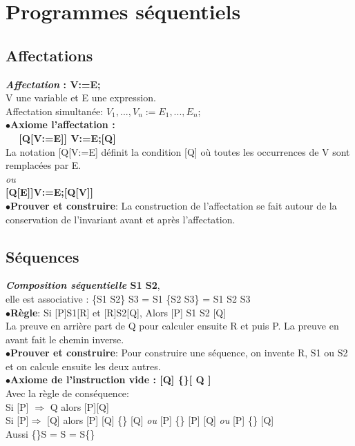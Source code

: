 \section{Programmes séquentiels}
\subsection{Affectations}
\textbf{\textit{Affectation} : V:=E;}\\ V une variable et E une expression.\\ 
Affectation simultanée: $V_1,...,V_n := E_1,...,E_n$;\\

$\bullet$\textbf{Axiome l'affectation :\\ $\quad$ [Q[V:=E]] V:=E;[Q]}\\
La notation [Q[V:=E] définit la condition [Q] où toutes les occurrences de V sont remplacées par E.\\
\textit{ou}\\
\textbf{[Q[E]]V:=E;[Q[V]]}\\

$\bullet$\textbf{Prouver et construire}:
La construction de l'affectation se fait autour de la conservation de l'invariant avant et après l'affectation.
\vspace{5mm}
\subsection{Séquences}
\textbf{\textit{Composition séquentielle} S1 S2},\\
elle est associative : \{S1 S2\} S3 = S1 \{S2 S3\} = S1 S2 S3\\

$\bullet$\textbf{Règle}:
Si [P]S1[R] et [R]S2[Q], Alors [P] S1 S2 [Q]\\
La preuve en arrière part de Q pour calculer ensuite R et puis P. La preuve en avant fait le chemin inverse.\\

$\bullet$\textbf{Prouver et construire}:
Pour construire une séquence, on invente R, S1 ou S2 et on calcule ensuite les deux autres.\\

$\bullet$\textbf{Axiome de l'instruction vide :  [Q] \{\}[ Q ]}\\
Avec la règle de conséquence:\\
Si [P] $\Rightarrow$ Q alors [P][Q]\\
Si [P]$\Rightarrow$ [Q] alors [P] [Q] \{\} [Q] \textit{ou} [P] \{\} [P] [Q] \textit{ou} [P] \{\} [Q]\\
Aussi \{\}S = S = S\{\}
\vspace{5mm}
